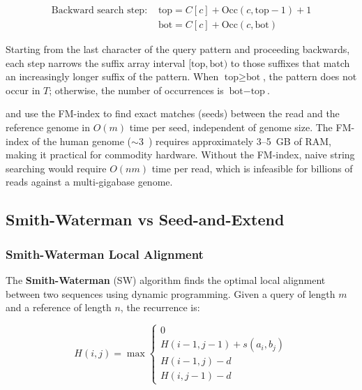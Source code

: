 \begin{align}
\text{Backward search step: } & \text{top} = C[c] + \text{Occ}(c, \text{top} - 1) + 1 \\
                               & \text{bot} = C[c] + \text{Occ}(c, \text{bot})
\end{align}

Starting from the last character of the query pattern and proceeding backwards, each step narrows the suffix array interval $[\text{top}, \text{bot})$ to those suffixes that match an increasingly longer suffix of the pattern. When $\text{top} \geq \text{bot}$, the pattern does not occur in $T$; otherwise, the number of occurrences is $\text{bot} - \text{top}$.

\begin{tipbox}[title={Why BWA-MEM Uses the FM-Index}]
 and  use the FM-index to find exact matches (seeds) between the read and the reference genome in $O(m)$ time per seed, independent of genome size. The FM-index of the human genome ($\sim$3~\gigabase) requires approximately 3--5~GB of RAM, making it practical for commodity hardware. Without the FM-index, naive string searching would require $O(nm)$ time per read, which is infeasible for billions of reads against a multi-gigabase genome.
\end{tipbox}

\subsection{Smith-Waterman vs Seed-and-Extend}
\label{subsec:bioinf:alignment}

\subsubsection{Smith-Waterman Local Alignment}

The \textbf{Smith-Waterman} (SW) algorithm finds the optimal local alignment between two sequences using dynamic programming. Given a query of length $m$ and a reference of length $n$, the recurrence is:

\begin{equation}
H(i,j) = \max \begin{cases}
  0 \\
  H(i-1, j-1) + s(a_i, b_j) \\
  H(i-1, j) - d \\
  H(i, j-1) - d
\end{cases}
\end{equation}

